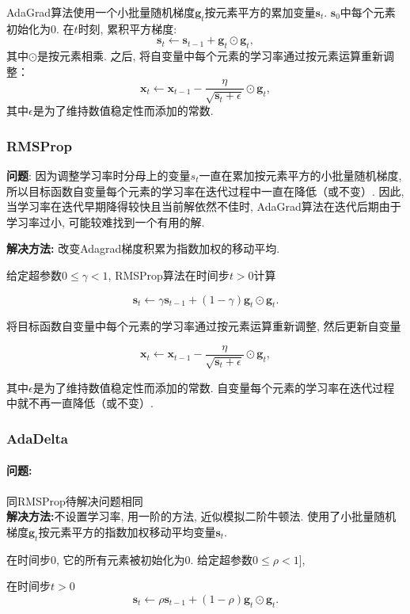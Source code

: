 \documentclass[a4paper]{article}
\theoremstyle{definition}
\numberwithin{equation}{section}
\begin{document}
AdaGrad算法使用一个小批量随机梯度$\boldsymbol{g}_t$按元素平方的累加变量$\boldsymbol{s}_t$.  $\boldsymbol{s}_0$中每个元素初始化为0. 在$t$时刻, 累积平方梯度:
$$\boldsymbol{s}_t \leftarrow \boldsymbol{s}_{t-1} + \boldsymbol{g}_t \odot \boldsymbol{g}_t, $$
其中$\odot$是按元素相乘. 
之后, 将自变量中每个元素的学习率通过按元素运算重新调整：
$$\boldsymbol{x}_t \leftarrow \boldsymbol{x}_{t-1} - \frac{\eta}{\sqrt{\boldsymbol{s}_t + \epsilon}} \odot \boldsymbol{g}_t, $$
其中$\epsilon$是为了维持数值稳定性而添加的常数.  

\subsubsection{RMSProp}
\textbf{问题}: 因为调整学习率时分⺟上的变量$s_t$⼀直在累加按元素平方的小批量随机梯度, 所以⽬标函数⾃变量每个元素的学习率在迭代过程中⼀直在降低（或不变）. 因此, 当学习率在迭代早期降得较快且当前解依然不佳时, AdaGrad算法在迭代后期由于学习率过小, 可能较难找到一个有用的解. 

 \textbf{解决方法:} 改变Adagrad梯度积累为指数加权的移动平均. 
 
给定超参数$0 \leq \gamma < 1$, RMSProp算法在时间步$t>0$计算

$$\boldsymbol{s}_t \leftarrow \gamma \boldsymbol{s}_{t-1} + (1 - \gamma) \boldsymbol{g}_t \odot \boldsymbol{g}_t. $$

将目标函数自变量中每个元素的学习率通过按元素运算重新调整, 然后更新自变量

$$\boldsymbol{x}_t \leftarrow \boldsymbol{x}_{t-1} - \frac{\eta}{\sqrt{\boldsymbol{s}_t + \epsilon}} \odot \boldsymbol{g}_t,  $$

其中$\epsilon$是为了维持数值稳定性而添加的常数. 自变量每个元素的学习率在迭代过程中就不再一直降低（或不变）. 
\subsubsection{AdaDelta}
\paragraph{问题:}同RMSProp待解决问题相同 \\
\textbf{解决方法:}不设置学习率, 用一阶的方法, 近似模拟二阶牛顿法. 使用了小批量随机梯度$\boldsymbol{g}_t$按元素平方的指数加权移动平均变量$\boldsymbol{s}_t$. 

在时间步0, 它的所有元素被初始化为0. 给定超参数$0 \leq \rho < 1$], 

在时间步$t>0$
$$\boldsymbol{s}_t \leftarrow \rho \boldsymbol{s}_{t-1} + (1 - \rho) \boldsymbol{g}_t \odot \boldsymbol{g}_t. $$
\end{document}
